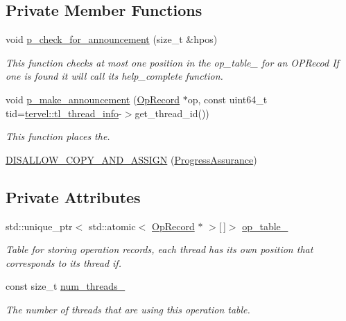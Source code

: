 \subsection*{Private Member Functions}
\begin{DoxyCompactItemize}
\item 
void \hyperlink{classtervel_1_1util_1_1_progress_assurance_af7f57b0721b40d5269416b6b8e5042f0}{p\+\_\+check\+\_\+for\+\_\+announcement} (size\+\_\+t \&hpos)
\begin{DoxyCompactList}\small\item\em This function checks at most one position in the op\+\_\+table\+\_\+ for an O\+P\+Recod If one is found it will call its help\+\_\+complete function. \end{DoxyCompactList}\item 
void \hyperlink{classtervel_1_1util_1_1_progress_assurance_a63193bc7abbdee5f81eef05986fc1c3e}{p\+\_\+make\+\_\+announcement} (\hyperlink{classtervel_1_1util_1_1_op_record}{Op\+Record} $\ast$op, const uint64\+\_\+t tid=\hyperlink{namespacetervel_a60b23602adbb2dee6160af411b74bfd3}{tervel\+::tl\+\_\+thread\+\_\+info}-\/$>$get\+\_\+thread\+\_\+id())
\begin{DoxyCompactList}\small\item\em This function places the. \end{DoxyCompactList}\item 
\hyperlink{classtervel_1_1util_1_1_progress_assurance_a923eb2780489a1bebb342c8fce904308}{D\+I\+S\+A\+L\+L\+O\+W\+\_\+\+C\+O\+P\+Y\+\_\+\+A\+N\+D\+\_\+\+A\+S\+S\+I\+G\+N} (\hyperlink{classtervel_1_1util_1_1_progress_assurance}{Progress\+Assurance})
\end{DoxyCompactItemize}
\subsection*{Private Attributes}
\begin{DoxyCompactItemize}
\item 
std\+::unique\+\_\+ptr$<$ std\+::atomic$<$ \hyperlink{classtervel_1_1util_1_1_op_record}{Op\+Record} $\ast$ $>$\mbox{[}$\,$\mbox{]}$>$ \hyperlink{classtervel_1_1util_1_1_progress_assurance_a7db95582f6fda286d62000d65963a926}{op\+\_\+table\+\_\+}
\begin{DoxyCompactList}\small\item\em Table for storing operation records, each thread has its own position that corresponds to its thread if. \end{DoxyCompactList}\item 
const size\+\_\+t \hyperlink{classtervel_1_1util_1_1_progress_assurance_a33770716cc5c51b06474d3a108992efb}{num\+\_\+threads\+\_\+}
\begin{DoxyCompactList}\small\item\em The number of threads that are using this operation table. \end{DoxyCompactList}\end{DoxyCompactItemize}


